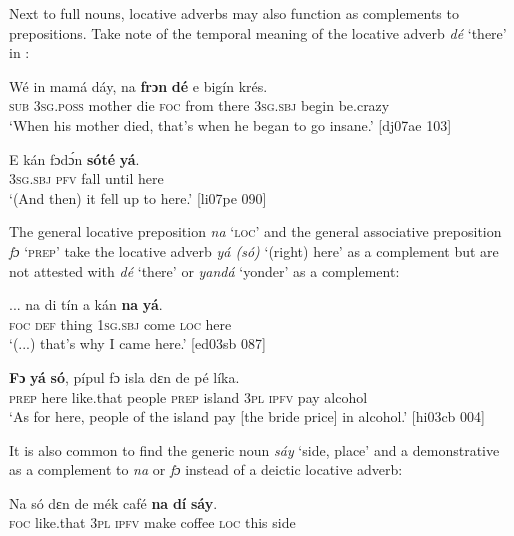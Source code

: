 Next to full nouns, locative adverbs may also function as complements to prepositions. Take note of the temporal meaning of the locative adverb \textit{dé} ‘there’ in :


\ea%
    \label{ex:key:902}
    \gll Wé  in    mamá  dáy,  na  \textbf{frɔn}    \textbf{dé}    e    bigín  krés.\\
\textsc{sub}  \textsc{3sg.poss}  mother  die  \textsc{foc}  from  there  \textsc{3sg.sbj}  begin  be.crazy\\

\glt ‘When his mother died, that’s when he began to go insane.’ [dj07ae 103]
\z


\ea%
    \label{ex:key:903}
    \gll E    kán    fɔdɔ́n  \textbf{sóté}    \textbf{yá}.\\
\textsc{3sg.sbj}  \textsc{pfv}    fall    until  here\\

\glt ‘(And then) it fell up to here.’ [li07pe 090]
\z

The general locative preposition \textit{na} ‘\textsc{loc}’ and the general associative preposition \textit{fɔ} ‘\textsc{prep}’ take the locative adverb \textit{yá (só)} ‘(right) here’ as a complement but are not attested with \textit{dé} ‘there’ or\textit{ yandá} ‘yonder’ as a complement: 


\ea%
    \label{ex:key:904}
    \gll \op...\cp{}  na  di  tín    a    kán    \textbf{na}  \textbf{yá}.\\
{}  \textsc{foc}  \textsc{def}  thing  \textsc{1sg.sbj}  come  \textsc{loc}  here\\

\glt ‘(...) that’s why I came here.’ [ed03sb 087]
\z


\ea%
    \label{ex:key:905}
    \gll \textbf{Fɔ}  \textbf{yá}    \textbf{só},    pípul  fɔ  isla    dɛn  de  pé  líka.\\
\textsc{prep}  here    like.that  people  \textsc{prep}  island  \textsc{3pl}  \textsc{ipfv}  pay  alcohol\\

\glt ‘As for here, people of the island pay [the bride price] in alcohol.’ [hi03cb 004]
\z

It is also common to find the generic noun \textit{sáy} ‘side, place’ and a demonstrative as a complement to \textit{na} or \textit{fɔ} instead of a deictic locative adverb: 


\ea%
    \label{ex:key:906}
    \gll Na  só    dɛn  de  mék    café    \textbf{na}  \textbf{dí}  \textbf{sáy}.\\
\textsc{foc}  like.that  \textsc{3pl}  \textsc{ipfv}  make  coffee  \textsc{loc}  this  side  \\

